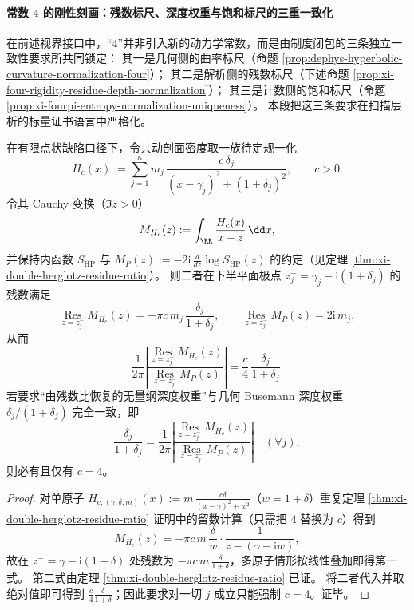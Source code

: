 \paragraph{常数 \texorpdfstring{$4$}{4} 的刚性刻画：残数标尺、深度权重与饱和标尺的三重一致化}
在前述视界接口中，“\(4\)”并非引入新的动力学常数，而是由制度闭包的三条独立一致性要求所共同锁定：
其一是几何侧的曲率标尺（命题 \ref{prop:dephys-hyperbolic-curvature-normalization-four}）；
其二是解析侧的残数标尺（下述命题 \ref{prop:xi-four-rigidity-residue-depth-normalization}）；
其三是计数侧的饱和标尺（命题 \ref{prop:xi-fourpi-entropy-normalization-uniqueness}）。
本段把这三条要求在扫描层析的标量证书语言中严格化。

\begin{proposition}\label{prop:xi-four-rigidity-residue-depth-normalization}
在有限点状缺陷口径下，令共动剖面密度取一族待定规一化
\[
H_c(x)
:=\sum_{j=1}^{\kappa} m_j\,\frac{c\,\delta_j}{(x-\gamma_j)^2+(1+\delta_j)^2},
\qquad c>0.
\]
令其 Cauchy 变换（\(\Im z>0\)）
\[
M_{H_c}(z):=\int_{\RR}\frac{H_c(x)}{x-z}\,\dd x,
\]
并保持内函数 \(S_{\mathrm{HP}}\) 与
\(
M_P(z):=-2\mathrm{i}\,\frac{d}{dz}\log S_{\mathrm{HP}}(z)
\)
的约定（见定理 \ref{thm:xi-double-herglotz-residue-ratio}）。
则二者在下半平面极点 \(z_j^-=\gamma_j-\mathrm{i}(1+\delta_j)\) 的残数满足
\[
\operatorname*{Res}_{z=z_j^-} M_{H_c}(z)=-\pi c\,m_j\,\frac{\delta_j}{1+\delta_j},
\qquad
\operatorname*{Res}_{z=z_j^-} M_{P}(z)=2\mathrm{i}\,m_j,
\]
从而
\[
\frac{1}{2\pi}\left|\frac{\operatorname*{Res}_{z=z_j^-} M_{H_c}(z)}{\operatorname*{Res}_{z=z_j^-} M_P(z)}\right|
=\frac{c}{4}\,\frac{\delta_j}{1+\delta_j}.
\]
若要求“由残数比恢复的无量纲深度权重”与几何 Busemann 深度权重 \(\delta_j/(1+\delta_j)\) 完全一致，即
\[
\frac{\delta_j}{1+\delta_j}
=\frac{1}{2\pi}\left|\frac{\operatorname*{Res}_{z=z_j^-} M_{H_c}(z)}{\operatorname*{Res}_{z=z_j^-} M_P(z)}\right|
\quad(\forall j),
\]
则必有且仅有 \(c=4\)。
\end{proposition}

\begin{proof}
对单原子 \(H_{c,(\gamma,\delta,m)}(x):=m\,\frac{c\delta}{(x-\gamma)^2+w^2}\)（\(w=1+\delta\)）重复定理 \ref{thm:xi-double-herglotz-residue-ratio} 证明中的留数计算（只需把 \(4\) 替换为 \(c\)）得到
\[
M_{H_c}(z)
=-\pi c\,m\,\frac{\delta}{w}\cdot\frac{1}{z-(\gamma-\mathrm{i}w)},
\]
故在 \(z^-=\gamma-\mathrm{i}(1+\delta)\) 处残数为 \(-\pi c\,m\,\frac{\delta}{1+\delta}\)，多原子情形按线性叠加即得第一式。
第二式由定理 \ref{thm:xi-double-herglotz-residue-ratio} 已证。
将二者代入并取绝对值即可得到 \(\frac{c}{4}\frac{\delta}{1+\delta}\)；因此要求对一切 \(j\) 成立只能强制 \(c=4\)。证毕。
\end{proof}

